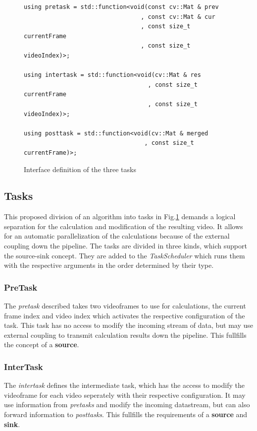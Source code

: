 \documentclass[titlepage]{article}
\begin{document}
\begin{figure}[H]
\begin{verbatim}
using pretask = std::function<void(const cv::Mat & prev
                                 , const cv::Mat & cur
                                 , const size_t currentFrame
                                 , const size_t videoIndex)>;

using intertask = std::function<void(cv::Mat & res
                                   , const size_t currentFrame
                                   , const size_t videoIndex)>;

using posttask = std::function<void(cv::Mat & merged
                                  , const size_t currentFrame)>;
\end{verbatim}
\caption{Interface definition of the three tasks}
\label{code:task-interfaces}
\end{figure}

\subsection{Tasks}
\label{header:tasks}

This proposed division of an algorithm into tasks in Fig.\ref{code:task-interfaces} demands a logical separation for the calculation and modification of the resulting video. It allows for an automatic parallelization of the calculations because of the external coupling down the pipeline. The tasks are divided in three kinds, which support the source-sink concept. They are added to the \textit{TaskScheduler} which runs them with the respective arguments in the order determined by their type.

\subsubsection{PreTask}
The \textit{pretask} described  takes two videoframes to use for calculations,
the current frame index and video index which activates the respective configuration of the task. This task has no access to modify the incoming stream of data, but may use external coupling to transmit calculation results down the pipeline. This fullfills the concept of a \textbf{source}.

\subsubsection{InterTask}
The \textit{intertask} defines the intermediate task, which has the access to modify the videoframe for each video seperately with their respective configuration. It may use information from \textit{pretasks} and modify the incoming datastream, but can also forward information to \textit{posttasks}. This fullfills the requirements of a \textbf{source} and \textbf{sink}.
\end{document}
